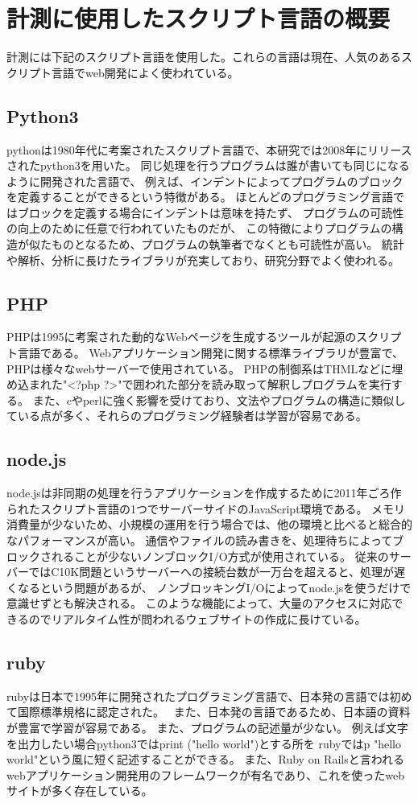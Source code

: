 \chapter{計測に使用したスクリプト言語の概要}
\label{cha:script-language}
計測には下記のスクリプト言語を使用した。これらの言語は現在、人気のあるスクリプト言語でweb開発によく使われている。
\section{Python3}
pythonは1980年代に考案されたスクリプト言語で、本研究では2008年にリリースされたpython3を用いた。
同じ処理を行うプログラムは誰が書いても同じになるように開発された言語で、
例えば、インデントによってプログラムのブロックを定義することができるという特徴がある。
ほとんどのプログラミング言語ではブロックを定義する場合にインデントは意味を持たず、
プログラムの可読性の向上のために任意で行われていたものだが、
この特徴によりプログラムの構造が似たものとなるため、プログラムの執筆者でなくとも可読性が高い。
統計や解析、分析に長けたライブラリが充実しており、研究分野でよく使われる。

\section{PHP}
PHPは1995に考案された動的なWebページを生成するツールが起源のスクリプト言語である。
Webアプリケーション開発に関する標準ライブラリが豊富で、PHPは様々なwebサーバーで使用されている。
PHPの制御系はTHMLなどに埋め込まれた"<?php ?>"で囲われた部分を読み取って解釈しプログラムを実行する。
また、cやperlに強く影響を受けており、文法やプログラムの構造に類似している点が多く、それらのプログラミング経験者は学習が容易である。

\section{node.js}
node.jsは非同期の処理を行うアプリケーションを作成するために2011年ごろ作られたスクリプト言語の1つでサーバーサイドのJavaScript環境である。
メモリ消費量が少ないため、小規模の運用を行う場合では、他の環境と比べると総合的なパフォーマンスが高い。
通信やファイルの読み書きを、処理待ちによってブロックされることが少ないノンブロックI/O方式が使用されている。
従来のサーバーではC10K問題というサーバーへの接続台数が一万台を超えると、処理が遅くなるという問題があるが、
ノンブロッキングI/Oによってnode.jsを使うだけで意識せずとも解決される。
このような機能によって、大量のアクセスに対応できるのでリアルタイム性が問われるウェブサイトの作成に長けている。

\section{ruby}
rubyは日本で1995年に開発されたプログラミング言語で、日本発の言語では初めて国際標準規格に認定された。　
また、日本発の言語であるため、日本語の資料が豊富で学習が容易である。
また、プログラムの記述量が少ない。
例えば文字を出力したい場合python3ではprint ("hello world")とする所を
rubyではp "hello world"という風に短く記述することができる。
また、Ruby on Railsと言われるwebアプリケーション開発用のフレームワークが有名であり、これを使ったwebサイトが多く存在している。
